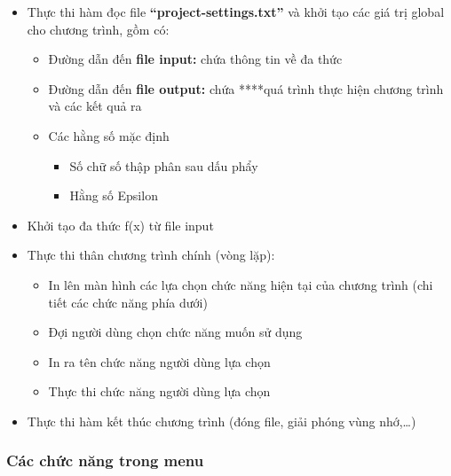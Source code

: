 \begin{itemize}
\itemsep1pt\parskip0pt
\item
  Thực thi hàm đọc file \textbf{``project-settings.txt''} và khởi tạo
  các giá trị global cho chương trình, gồm có:

  \begin{itemize}
  \itemsep1pt\parskip0pt
  \item
    Đường dẫn đến \textbf{file input:} chứa thông tin về đa thức
  \item
    Đường dẫn đến \textbf{file output:} chứa ****quá trình thực hiện
    chương trình và các kết quả ra
  \item
    Các hằng số mặc định

    \begin{itemize}
    \itemsep1pt\parskip0pt
    \item
      Số chữ số thập phân sau dấu phẩy
    \item
      Hằng số Epsilon
    \end{itemize}
  \end{itemize}
\item
  Khởi tạo đa thức f(x) từ file input
\item
  Thực thi thân chương trình chính (vòng lặp):

  \begin{itemize}
  \itemsep1pt\parskip0pt
  \item
    In lên màn hình các lựa chọn chức năng hiện tại của chương trình
    (chi tiết các chức năng phía dưới)
  \item
    Đợi người dùng chọn chức năng muốn sử dụng
  \item
    In ra tên chức năng người dùng lựa chọn
  \item
    Thực thi chức năng người dùng lựa chọn
  \end{itemize}
\item
  Thực thi hàm kết thúc chương trình (đóng file, giải phóng vùng
  nhớ,\ldots{})
\end{itemize}

\subsubsection{Các chức năng trong
menu}\label{cuxe1c-chux1ee9c-nux103ng-trong-menu}

